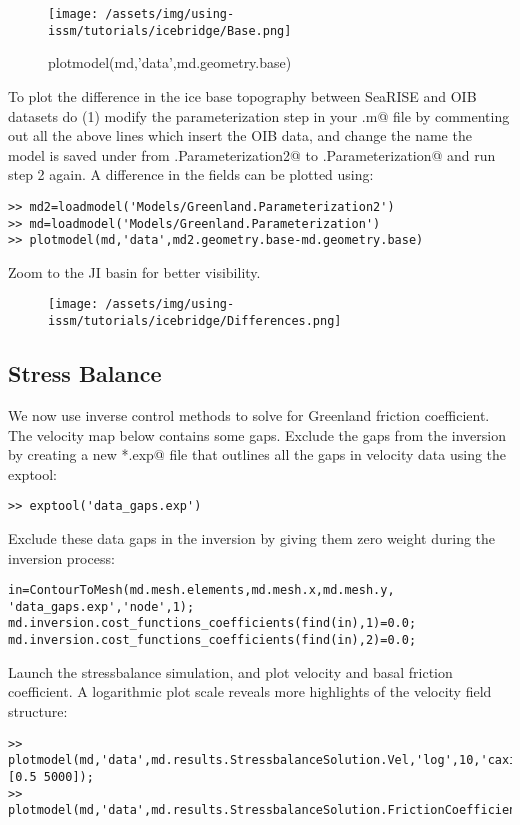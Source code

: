 \begin{figure}[H]
	\begin{center}
	\texttt{[image: /assets/img/using-issm/tutorials/icebridge/Base.png]}
	\caption{plotmodel(md,'data',md.geometry.base)}
	\end{center}
\end{figure}
To plot the difference in the ice base topography between SeaRISE and OIB datasets do (1) modify the parameterization step in your \verb@runme.m@ file by commenting out all the above lines which insert the OIB data, and change the name the model is saved under from \verb@Greenland.Parameterization2@ to \verb@Greenland.Parameterization@ and run step 2 again. A difference in the fields can be plotted using:
\begin{verbatim}>> md2=loadmodel('Models/Greenland.Parameterization2')
>> md=loadmodel('Models/Greenland.Parameterization')
>> plotmodel(md,'data',md2.geometry.base-md.geometry.base)\end{verbatim}
Zoom to the JI basin for better visibility.
\begin{figure}[H]
	\begin{center}
		\texttt{[image: /assets/img/using-issm/tutorials/icebridge/Differences.png]}
	\end{center}
\end{figure}
\subsection{Stress Balance} %
We now use inverse control methods to solve for Greenland friction coefficient. The velocity map below contains some gaps. Exclude the gaps from the inversion by creating a new \verb@*.exp@ file that outlines all the gaps in velocity data using the exptool:
\begin{verbatim}>> exptool('data_gaps.exp')\end{verbatim}

Exclude these data gaps in the inversion by giving them zero weight during the inversion process:
\begin{verbatim}in=ContourToMesh(md.mesh.elements,md.mesh.x,md.mesh.y, 'data_gaps.exp','node',1);
md.inversion.cost_functions_coefficients(find(in),1)=0.0;
md.inversion.cost_functions_coefficients(find(in),2)=0.0;\end{verbatim}

Launch the stressbalance simulation, and plot velocity and basal friction coefficient. A logarithmic
plot scale reveals more highlights of the velocity field structure:
\begin{verbatim}>> plotmodel(md,'data',md.results.StressbalanceSolution.Vel,'log',10,'caxis',[0.5 5000]);
>> plotmodel(md,'data',md.results.StressbalanceSolution.FrictionCoefficient);\end{verbatim}

